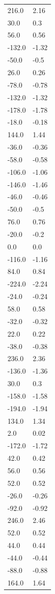 \begin{longtable}{ll}
216.0 & 2.16 \\
30.0 & 0.3 \\
56.0 & 0.56 \\
-132.0 & -1.32 \\
-50.0 & -0.5 \\
26.0 & 0.26 \\
-78.0 & -0.78 \\
-132.0 & -1.32 \\
-178.0 & -1.78 \\
-18.0 & -0.18 \\
144.0 & 1.44 \\
-36.0 & -0.36 \\
-58.0 & -0.58 \\
-106.0 & -1.06 \\
-146.0 & -1.46 \\
-46.0 & -0.46 \\
-50.0 & -0.5 \\
76.0 & 0.76 \\
-20.0 & -0.2 \\
0.0 & 0.0 \\
-116.0 & -1.16 \\
84.0 & 0.84 \\
-224.0 & -2.24 \\
-24.0 & -0.24 \\
58.0 & 0.58 \\
-32.0 & -0.32 \\
22.0 & 0.22 \\
-38.0 & -0.38 \\
236.0 & 2.36 \\
-136.0 & -1.36 \\
30.0 & 0.3 \\
-158.0 & -1.58 \\
-194.0 & -1.94 \\
134.0 & 1.34 \\
2.0 & 0.02 \\
-172.0 & -1.72 \\
42.0 & 0.42 \\
56.0 & 0.56 \\
52.0 & 0.52 \\
-26.0 & -0.26 \\
-92.0 & -0.92 \\
246.0 & 2.46 \\
52.0 & 0.52 \\
44.0 & 0.44 \\
-44.0 & -0.44 \\
-88.0 & -0.88 \\
164.0 & 1.64 \\

\end{longtable}
